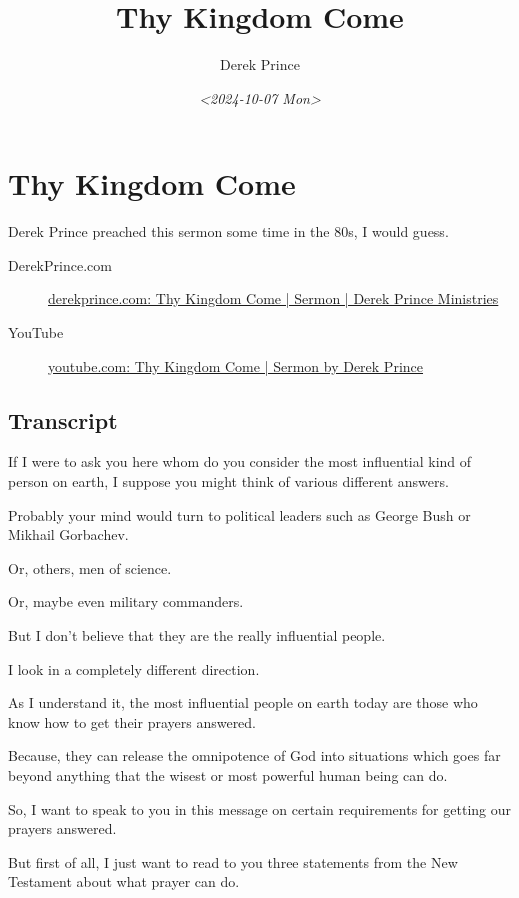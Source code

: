 \documentclass[11pt]{article}
\author{Derek Prince}
\date{\textit{<2024-10-07 Mon>}}
\title{Thy Kingdom Come}
\begin{document}
\maketitle

\section{Thy Kingdom Come}
\label{sec:org698e71f}

Derek Prince preached this sermon some time in the 80s, I would guess.

\begin{description}
\item[{DerekPrince.com}] \href{https://www.derekprince.com/sermons/409}{derekprince.com: Thy Kingdom Come | Sermon | Derek Prince Ministries}

\item[{YouTube}] \href{https://www.youtube.com/watch?v=9L-ZM0g6yf0}{youtube.com: Thy Kingdom Come | Sermon by Derek Prince}
\end{description}

\subsection{Transcript}
\label{sec:org801293f}

If I were to ask you here whom do you consider
the most influential kind of person on earth,
I suppose you might think of various different
answers.

Probably your mind would turn to political
leaders such as George Bush or Mikhail
Gorbachev.

Or, others, men of science.

Or, maybe even military commanders.

But I don't believe that they are the really
influential people.

I look in a completely different direction.

As I understand it, the most influential
people on earth today are those who know how
to get their prayers answered.

Because, they can release the omnipotence of
God into situations which goes far beyond
anything that the wisest or most powerful
human being can do.

So, I want to speak to you in this message on
certain requirements for getting our prayers
answered.

But first of all, I just want to read to you
three statements from the New Testament about
what prayer can do.
\end{document}
